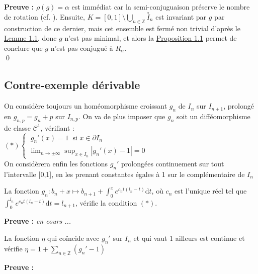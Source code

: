 \documentclass[11pt,a4paper]{article}
\begin{document}
\textbf{Preuve :} $\rho(g)=\alpha$ est immédiat car la semi-conjuguaison préserve le nombre de rotation (cf. \cite{dgv}).
Ensuite, $K = [0,1] \setminus \bigcup_{n \in \mathbb{Z}} \overset{\circ}I_{n}$ est invariant par $g$ par construction de ce dernier, mais cet ensemble est fermé non trivial d'après le  \hyperref[lem:cantor]{Lemme 1.1}, donc $g$ n'est pas minimal, et alors la \hyperref[prop:mini]{Proposition 1.1} permet de conclure que $g$ n'est pas conjugué à $R_\alpha$. \\ \qed

\subsection{Contre-exemple dérivable}

On considère toujours un homéomorphisme croissant $g_n$ de $I_n$ sur $I_{n+1}$, prolongé en $g_{n,p} = g_n +p$ sur $I_{n,p}$. On va de plus imposer que $g_n$ soit un difféomorphisme de classe $\mathcal{C}^1$, vérifiant : \\

$(*) \begin{cases}\ g_n'(x)=1 \ \text{ si } x \in \partial I_n \\ \displaystyle \lim_{n \to \pm \infty}\sup_{x\in I_n}|g_n'(x)-1|=0 \end{cases}$ \\

On considèrera enfin les fonctions $g_n'$ prolongées continuement sur tout l'intervalle [0,1], en les prenant constantes égales à 1 sur le complémentaire de $I_n$

\begin{lemma}\textbf{\cite{milnor}}
La fonction $\displaystyle g_n : b_n +x \mapsto b_{n+1} + \int_0^x e^{c_nt(l_n-t)} \mathrm{d}t$, où $c_n$ est l'unique réel tel que $\displaystyle \int_0^{l_n} e^{c_nt(l_n-t)} \mathrm{d}t = l_{n+1}$, vérifie la condition $(*)$.
\end{lemma}

\textbf{Preuve :} \textit{en cours ...} \\

\begin{lemma}
La fonction $\eta$ qui coïncide avec $g_n'$ sur $I_n$ et qui vaut $1$ ailleurs est continue et vérifie $\displaystyle \eta =  1 + \sum_{n \in \mathbb{Z}} (g_n'-1)$
\end{lemma}

\textbf{Preuve :} 
\end{document}
